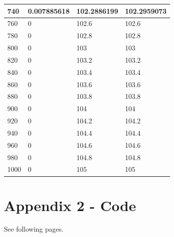 \documentclass[12pt]{article}
\begin{document}
\begin{longtable}{|l|l|l|l|}
    740  & 0.007885618 & 102.2886199                & 102.2959073             \\ \hline
    760  & 0           & 102.6                      & 102.6                   \\ \hline
    780  & 0           & 102.8                      & 102.8                   \\ \hline
    800  & 0           & 103                        & 103                     \\ \hline
    820  & 0           & 103.2                      & 103.2                   \\ \hline
    840  & 0           & 103.4                      & 103.4                   \\ \hline
    860  & 0           & 103.6                      & 103.6                   \\ \hline
    880  & 0           & 103.8                      & 103.8                   \\ \hline
    900  & 0           & 104                        & 104                     \\ \hline
    920  & 0           & 104.2                      & 104.2                   \\ \hline
    940  & 0           & 104.4                      & 104.4                   \\ \hline
    960  & 0           & 104.6                      & 104.6                   \\ \hline
    980  & 0           & 104.8                      & 104.8                   \\ \hline
    1000 & 0           & 105                        & 105                     \\ \hline
    \end{longtable}


    \newpage
\section*{Appendix 2 - Code}

See following pages.


\end{document}
